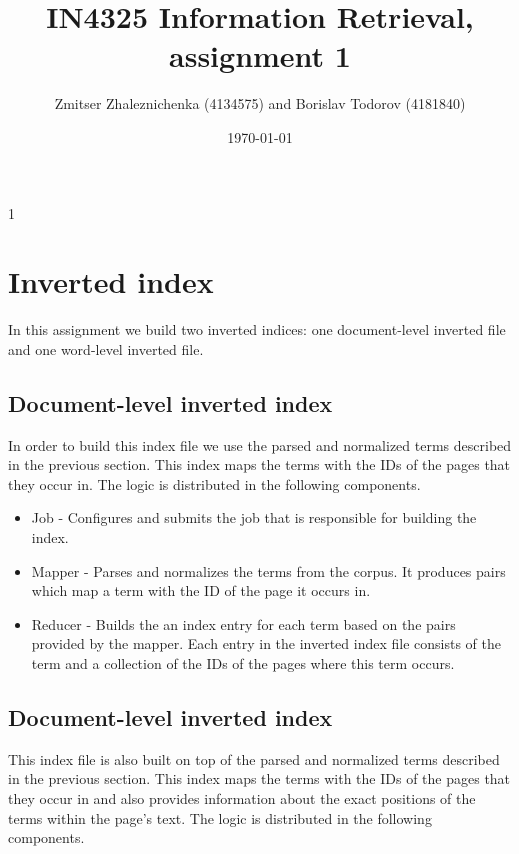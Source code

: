 \documentclass[a4paper, notitlepage]{report}
\begin{document}
\title{IN4325 Information Retrieval, assignment 1}
\author{Zmitser Zhaleznichenka (4134575) and Borislav Todorov (4181840)}
\date{\today}
\maketitle

\begin{description}
\item[1] \hfill

\end{description}

\section{Inverted index}
In this assignment we build two inverted indices: one document-level inverted file and one word-level inverted file.

\subsection{Document-level inverted index}
In order to build this index file we use the parsed and normalized terms described in the previous section. This index maps the terms with the IDs of the pages that they occur in. The logic is distributed in the following components.

\begin{itemize}
	\item Job - Configures and submits the job that is responsible for building the index.
	\item Mapper - Parses and normalizes the terms from the corpus. It produces pairs which map a term with the ID of the page it occurs in.
	\item Reducer - Builds the an index entry for each term based on the pairs provided by the mapper. Each entry in the inverted index file consists of the term and a collection of the IDs of the pages where this term occurs.  
\end{itemize}

\subsection{Document-level inverted index}
This index file is also built on top of the parsed and normalized terms described in the previous section. This index maps the terms with the IDs of the pages that they occur in and also provides information about the exact positions of the terms within the page's text. The logic is distributed in the following components.
\end{document}
